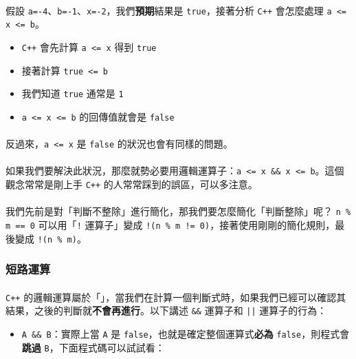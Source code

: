 \documentclass[12pt,a4paper,oneside]{article}
\begin{document}
\begin{CJK}{UTF8}{bkai}
\paragraph{}假設 \lstinline!a=-4!、\lstinline!b=-1!、\lstinline!x=-2!，我們\textbf{預期}結果是 \lstinline!true!，接著分析 \texttt{C++} 會怎麼處理 \lstinline!a <= x <= b!。
\begin{itemize}
\item \texttt{C++} 會先計算 \lstinline!a <= x! 得到 \lstinline!true!
\item 接著計算 \lstinline!true <= b!
\item 我們知道 \lstinline!true! 通常是 \lstinline!1!
\item \lstinline!a <= x <= b! 的回傳值就會是 \lstinline!false!
\end{itemize}

\paragraph{}反過來，\lstinline!a <= x! 是 \lstinline!false! 的狀況也會有同樣的問題。
\paragraph{}如果我們要解決此狀況，那麼就勢必要用邏輯運算子：\lstinline!a <= x && x <= b!。這個觀念常常是剛上手 \texttt{C++} 的人常常踩到的誤區，可以多注意。

\paragraph{}我們先前是對「判斷不整除」進行簡化，那我們要怎麼簡化「判斷整除」呢？ \lstinline!n % m == 0! 可以用「\lstinline"!" 運算子」變成 \lstinline"!(n % m != 0)"，接著使用剛剛的簡化規則，最後變成 \lstinline"!(n % m)"。

\subsubsection{短路運算}

\paragraph{}\texttt{C++} 的邏輯運算屬於「」，當我們在計算一個判斷式時，如果我們已經可以確認其結果，之後的判斷就\textbf{不會再進行}。以下講述 \lstinline!&&! 運算子和 \lstinline!||! 運算子的行為：

\begin{itemize}
\item \lstinline!A && B!：實際上當 \lstinline!A! 是 \lstinline!false!，也就是確定整個運算式\textbf{必為} \lstinline!false!，則程式會\textbf{跳過} \lstinline!B!，下面程式碼可以試試看：


\end{itemize}
\end{CJK}
\end{document}
